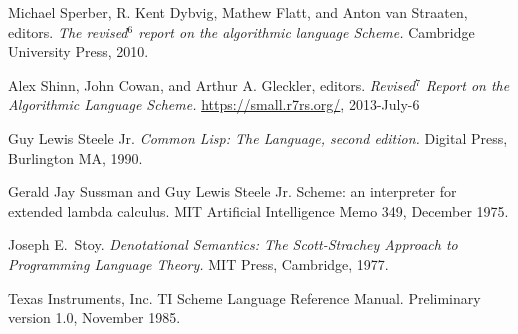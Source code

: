 \begin{thebibliography}{999}
Michael Sperber, R. Kent Dybvig, Mathew Flatt, and Anton van Straaten, editors.
{\em The revised$^6$ report on the algorithmic language Scheme.}
Cambridge University Press, 2010.

  Alex Shinn, John Cowan, and Arthur A. Gleckler, editors.
  {\em Revised$^7$ Report on the Algorithmic Language Scheme.}
  \url{https://small.r7rs.org/}, 2013-July-6

Guy Lewis Steele Jr.
{\em Common Lisp: The Language, second edition.}
Digital Press, Burlington MA, 1990.

Gerald Jay Sussman and Guy Lewis Steele Jr.
Scheme: an interpreter for extended lambda calculus.
MIT Artificial Intelligence Memo 349, December 1975.

Joseph E.~Stoy.
{\em Denotational Semantics: The Scott-Strachey Approach to
  Programming Language Theory.}
MIT Press, Cambridge, 1977.

Texas Instruments, Inc.
TI Scheme Language Reference Manual.
Preliminary version 1.0, November 1985. 



\end{thebibliography}
